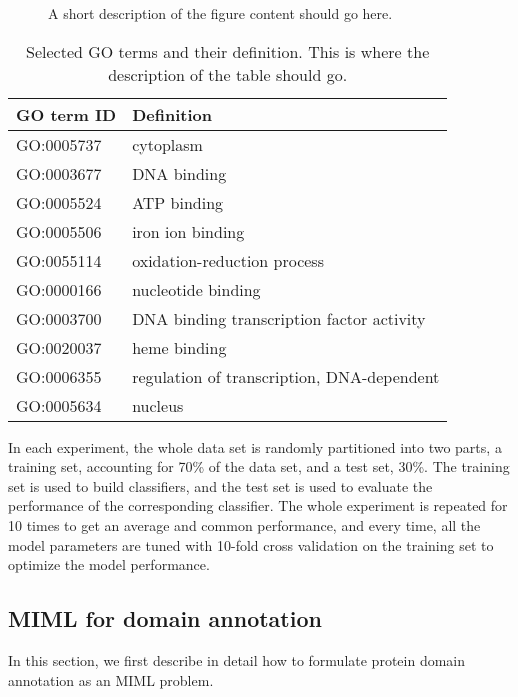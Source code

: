\documentclass{bmcart}
\begin{document}
  \begin{figure}[h!]
  
  \caption{
      A short description of the figure content
      should go here.}
  \end{figure}
  
  \begin{table}[h!]
    \caption{Selected GO terms and their definition. This is where the description of the table should go.}
      \begin{tabular}{ll}
    \hline
    GO term ID  &Definition\\
    \hline
    GO:0005737  &cytoplasm\\[2pt]
    GO:0003677  &DNA binding\\[2pt]
    GO:0005524  &ATP binding\\[2pt]
    GO:0005506  &iron ion binding\\[2pt]
    GO:0055114  &oxidation-reduction process\\[2pt]
    GO:0000166  &nucleotide binding\\[2pt]
    GO:0003700  &DNA binding transcription factor activity\\[2pt]
    GO:0020037  &heme binding\\[2pt]
    GO:0006355  &regulation of transcription, DNA-dependent\\[2pt]
    GO:0005634  &nucleus\\
    \hline
    \end{tabular}
  \end{table}

In each experiment, the whole data set is randomly partitioned into two parts, a training set, accounting for 70\% of the data set, and a test set, 30\%. The training set is used to build classifiers, and the test set is used to evaluate the performance of the corresponding classifier. The whole experiment is repeated for 10 times to get an average and common performance, and every time, all the model parameters are tuned with 10-fold cross validation on the training set to optimize the model performance.

\subsection*{MIML for domain annotation}
In this section, we first describe in detail how to formulate protein domain annotation as an MIML problem.
\end{document}
